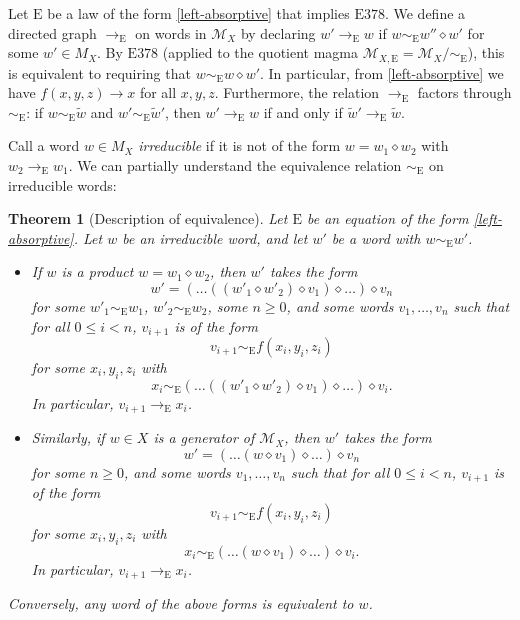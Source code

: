 \documentclass[12pt]{amsart}
\newtheorem{theorem}{Theorem}[section]
\theoremstyle{definition}
\newcommand{\op}{\diamond}
\newcommand{\Magma}{{\mathcal{M}}}
\newcommand{\Eq}[1]{\mathrm{E}#1}
\newcommand{\E}{\mathrm{E}}
\begin{document}
Let $\E$ be a law of the form \eqref{left-absorptive} that implies $\Eq{378}$. We define a directed graph $\to_\E$ on words in $\Magma_X$ by declaring $w' \to_\E w$ if $w \sim_\E w'' \op w'$ for some $w' \in M_X$.  By $\Eq{378}$ (applied to the quotient magma $\Magma_{X,\E} = \Magma_X/\sim_\E$), this is equivalent to requiring that $w \sim_\E w \op w'$. In particular, from \eqref{left-absorptive} we have $f(x,y,z) \to x$ for all $x,y,z$.  Furthermore, the relation $\to_\E$ factors through $\sim_\E$: if $w \sim_\E \tilde w$ and $w' \sim_\E \tilde w'$, then $w' \to_\E w$ if and only if $\tilde w' \to_\E \tilde w$.

Call a word $w \in M_X$ \emph{irreducible} if it is not of the form $w = w_1 \op w_2$ with $w_2 \to_\E w_1$.  We can partially understand the equivalence relation $\sim_\E$ on irreducible words:

\begin{theorem}[Description of equivalence]\label{irred-desc}  Let $\E$ be an equation of the form \eqref{left-absorptive}.  Let $w$ be an irreducible word, and let $w'$ be a word with $w \sim_\E w'$.
  \setlength{\parskip}{0pt}
  \begin{itemize}
    \item[(i)] If $w$ is a product $w = w_1 \op w_2$, then $w'$ takes the form
$$ w' = ({}\dots((w'_1 \op w'_2) \op v_1) \op \dots{}) \op v_n$$
for some $w'_1 \sim_\E w_1$, $w'_2 \sim_\E w_2$, some $n \geq 0$, and some words $v_1, \dots, v_n$ such that for all $0 \leq i < n$, $v_{i+1}$ is of the form
$$ v_{i+1} \sim_\E f(x_i,y_i,z_i)$$
for some $x_i, y_i, z_i$ with
$$ x_i \sim_\E ({}\dots((w'_1 \op w'_2) \op v_1) \op \dots{}) \op v_i.$$
In particular, $v_{i+1} \to_\E x_i$.
  \item[(ii)] Similarly, if $w \in X$ is a generator of $\Magma_X$, then $w'$ takes the form
$$ w' = ({}\dots(w \op v_1) \op \dots {}) \op v_n$$
for some $n \geq 0$, and some words $v_1, \dots, v_n$ such that for all $0 \leq i < n$, $v_{i+1}$ is of the form
$$ v_{i+1} \sim_\E f(x_i,y_i,z_i)$$
for some $x_i, y_i, z_i$ with
$$ x_i \sim_\E ({}\dots(w \op v_1) \op \dots{}) \op v_i.$$
In particular, $v_{i+1} \to_\E x_i$.
\end{itemize}
Conversely, any word of the above forms is equivalent to $w$.
\end{theorem}
\end{document}
